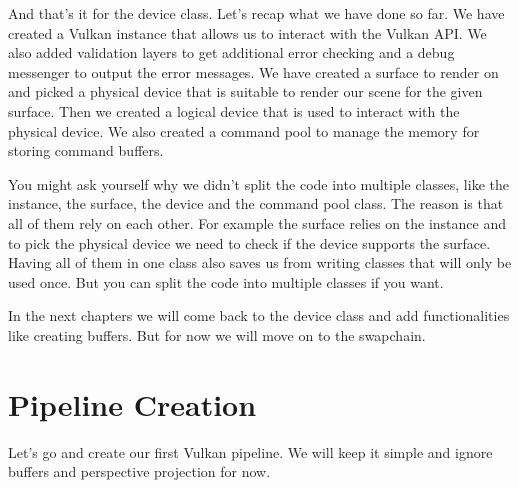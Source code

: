 \documentclass[12pt]{report} \usepackage{preamble}
\begin{document}
And that's it for the device class. Let's recap what we have done so far. We have created a Vulkan instance
that allows us to interact with the Vulkan API. We also added validation layers to get additional error checking
and a debug messenger to output the error messages. We have created a surface to render on and picked a physical
device that is suitable to render our scene for the given surface. Then we created a logical device that is used
to interact with the physical device. We also created a command pool to manage the memory for storing command buffers.

You might ask yourself why we didn't split the code into multiple classes, like the instance, the surface, the device and
the command pool class. The reason is that all of them rely on each other. For example the surface relies on the instance
and to pick the physical device we need to check if the device supports the surface. Having all of them in one class
also saves us from writing classes that will only be used once. But you can split the code into multiple classes if you want.

In the next chapters we will come back to the device class and add functionalities like creating buffers. But for now
we will move on to the swapchain.

\section{Pipeline Creation}

Let's go and create our first Vulkan pipeline. We will keep it simple and ignore
buffers and perspective projection for now.


\printbibliography[
	heading=bibintoc, title={Bibliography}
]

\listoffigures
\end{document}
